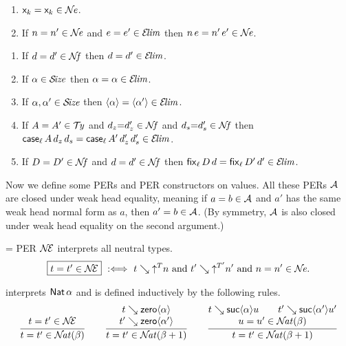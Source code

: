 \documentclass[acmsmall%
]{acmart}\settopmatter{printfolios=true}
\makeatletter
\def\fleq{\@fleqntrue\let\mathindent\@mathmargin \@mathmargin=\leftmargini}
\makeatother
\begin{document}
\begin{lemma}
  \label{lem:closne}
  \bla
  \begin{enumerate}
  \item $\lev k = \lev k \in \NE$.
  \item If\/ $n = n' \in \NE$ and $e = e' \in \ELIM$ then $n\,e = n'\,e' \in \NE$.
  \end{enumerate}
\end{lemma}

\begin{lemma}
  \label{lem:closelim}
  \bla
  \begin{enumerate}
  \item If\/ $d = d' \in \NF$ then $d = d' \in \ELIM$.
  \item If\/ $\alpha \in \SIZE$ then $\alpha = \alpha \in \ELIM$.
  \item If\/ $\alpha,\alpha' \in \SIZE$ then $\ann \alpha = \ann{\alpha'} \in \ELIM$.
  \item If\/ $A = A' \in \TY$ and $d_z {=} d_z' \in \NF$ and $d_s {=} d_s' \in \NF$
        then $\case[\ell] A {d_z}{d_s} = \case[\ell]{A'}{d_z'}{d_s'} \in \ELIM$.
  \item If\/ $D = D' \in \NF$ and $d = d' \in \NF$ then $\fix[\ell] D d = \fix[\ell]{D'}{d'} \in \ELIM$.
  \end{enumerate}
\end{lemma}

Now we define some PERs and PER constructors on values.  All these PERs $\A$ are closed under weak head equality, meaning if $a = b \in \A$ and $a'$ has the same weak head normal form as $a$, then $a' = b \in \A$.  (By symmetry, $\A$ is also closed under weak head equality on the second argument.)

\fleq
PER $\NEE$ interprets all neutral types.
\[
\fbox{$t = t' \in \NEE$} \defas
  t \evalsto \up T n \mand t' \evalsto \up{T'}{n'} \mand
  n = n' \in \NE
  .
\]

\fbox{$\NAT(\alpha)$} interprets $\Nat \alpha$ and is defined inductively by the following rules.
\begin{gather*}
  \ru{%
      t = t' \in \NEE
    }{t = t' \in \NAT(\beta)}
\qquad
  \ru{t \evalsto \zero \alpha \\
      t' \evalsto \zero{\alpha'}
    }{t = t' \in \NAT(\beta+1)}
\qquad
  \ru{t \evalsto \suc \alpha u \qquad
      t' \evalsto \suc {\alpha'} {u'} \\
      u = u' \in \NAT(\beta)
    }{t = t' \in \NAT(\beta+1)}
\end{gather*}
\end{document}
